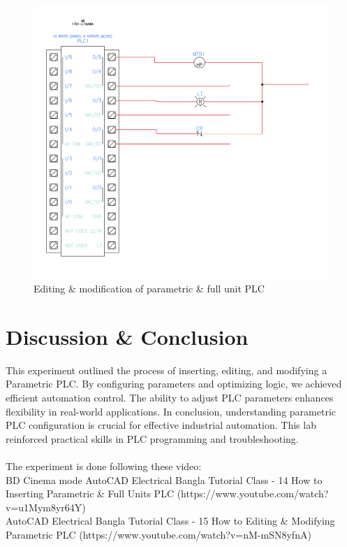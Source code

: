 \documentclass[12pt]{article}
\begin{document}
\begin{figure}[H]
    \centering
    \includegraphics[width=\textwidth]{2.png}
    \caption{Editing \& modification of parametric \& full unit PLC}
    \label{fig:edit}
\end{figure}

\section*{Discussion \& Conclusion}
This experiment outlined the process of inserting, editing, and modifying a Parametric PLC. By configuring parameters and optimizing logic, we achieved efficient automation control. The ability to adjust PLC parameters enhances flexibility in real-world applications. In conclusion, understanding parametric PLC configuration is crucial for effective industrial automation. This lab reinforced practical skills in PLC programming and troubleshooting.
\\\\
The experiment is done following these video:\\
BD
Cinema mode
AutoCAD Electrical Bangla Tutorial Class - 14 How to Inserting Parametric \& Full Units PLC (https://www.youtube.com/watch?v=u1Mym8yr64Y)
\\
AutoCAD Electrical Bangla Tutorial Class - 15 How to Editing \& Modifying Parametric PLC (https://www.youtube.com/watch?v=nM-mSN8yfnA)


\renewcommand{\bibname}{References}

\end{document}

